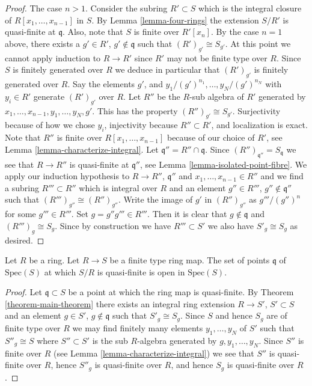 \begin{proof}
\medskip\noindent
The case $n > 1$. Consider the subring $R' \subset S$
which is the integral closure of $R[x_1,\ldots,x_{n-1}]$
in $S$. By Lemma \ref{lemma-four-rings} the extension
$S/R'$ is quasi-finite at $\mathfrak q$. Also, note
that $S$ is finite over $R'[x_n]$.
By the case $n = 1$ above, there exists a $g' \in R'$,
$g' \not \in \mathfrak q$ such that
$(R')_{g'} \cong S_{g'}$. At this point we cannot
apply induction to $R \to R'$ since $R'$ may not be finite type over $R$.
Since $S$ is finitely generated over $R$ we deduce in particular
that $(R')_{g'}$ is finitely generated over $R$. Say
the elements $g'$, and $y_1/(g')^{n_1},\ldots, y_N/(g')^{n_N}$
with $y_i \in R'$
generate $(R')_{g'}$ over $R$. Let $R''$ be the $R$-sub algebra
of $R'$ generated by $x_1,\ldots,x_{n-1}, y_1,\ldots,y_N, g'$.
This has the property $(R'')_{g'} \cong S_{g'}$. Surjectivity
because of how we chose $y_i$, injectivity because
$R'' \subset R'$, and localization is exact. Note that
$R''$ is finite over $R[x_1,\ldots,x_{n-1}]$ because
of our choice of $R'$, see Lemma \ref{lemma-characterize-integral}.
Let $\mathfrak q'' = R'' \cap \mathfrak q$. Since
$(R'')_{\mathfrak q''} = S_{\mathfrak q}$ we see that
$R \to R''$ is quasi-finite at $\mathfrak q''$, see
Lemma \ref{lemma-isolated-point-fibre}.
We apply our induction hypothesis to $R \to R''$, $\mathfrak q''$
and $x_1,\ldots,x_{n-1} \in R''$ and we find a subring
$R''' \subset R''$ which is integral over $R$ and an
element $g'' \in R'''$, $g'' \not \in \mathfrak q''$
such that $(R''')_{g''} \cong (R'')_{g''}$. Write the image of $g'$ in
$(R'')_{g''}$ as $g'''/(g'')^n$ for some $g''' \in  R'''$.
Set $g = g''g''' \in R'''$. Then it is clear that $g \not\in
\mathfrak q$ and $(R''')_g \cong S_g$. Since by construction
we have $R''' \subset S'$ we also have $S'_g \cong S_g$ as desired.
\end{proof}

\begin{lemma}
\label{lemma-quasi-finite-open}
Let $R$ be a ring. Let $R \to S$ be a finite type ring map.
The set of points $\mathfrak q$ of $\text{Spec}(S)$ at which
$S/R$ is quasi-finite is open in $\text{Spec}(S)$.
\end{lemma}

\begin{proof}
Let $\mathfrak q \subset S$ be a point at which the ring map
is quasi-finite. By Theorem \ref{theorem-main-theorem}
there exists an integral ring extension $R \to S'$, $S' \subset S$
and an element $g \in S'$, $g\not \in \mathfrak q$ such that
$S'_g \cong S_g$. Since $S$ and hence $S_g$ are of finite type
over $R$ we may find finitely many elements
$y_1,\ldots, y_N$ of $S'$ such that $S''_g \cong S$
where $S'' \subset S'$ is the sub $R$-algebra generated
by $g, y_1,\ldots, y_N$. Since $S''$ is finite over $R$
(see Lemma \ref{lemma-characterize-integral}) we see that
$S''$ is quasi-finite over $R$, hence
$S''_g$ is quasi-finite over $R$, and hence 
$S_g$ is quasi-finite over $R$.
\end{proof}

